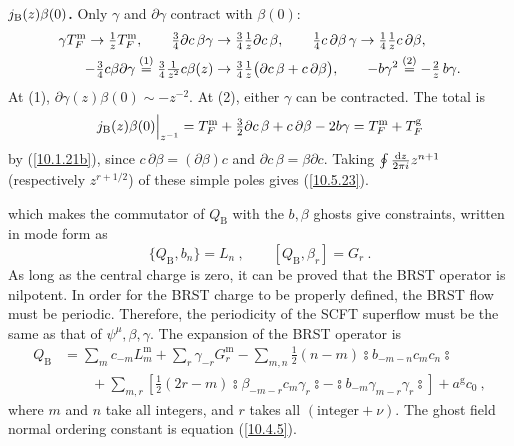 \begin{tcolorbox}[breakable]
\begin{remark}
			\textbf{$j_{\rm B}(z)\beta(0)$.} Only $\gamma$ and $\partial\gamma$ contract with $\beta(0)$:
			\begin{align*}
				\gamma T^{\mathrm m}_F\to\tfrac1zT^{\mathrm m}_F,\qquad \tfrac34\partial c\,\beta\gamma&\to\tfrac34\tfrac1z\partial c\,\beta,\qquad \tfrac14c\,\partial\beta\,\gamma\to\tfrac14\tfrac1zc\,\partial\beta,\\
				-\tfrac34c\beta\partial\gamma\overset{(1)}{=}\tfrac34\tfrac1{z^{2}}c\beta(z)&\to\tfrac34\tfrac1z\bigl(\partial c\,\beta+c\,\partial\beta\bigr),\qquad -b\gamma^{2}\overset{(2)}{=}-\tfrac2z\,b\gamma .
			\end{align*}
			At (1), $\partial\gamma(z)\beta(0)\sim-z^{-2}$. At (2), either $\gamma$ can be contracted. The total is
			\begin{equation*}
				j_{\rm B}(z)\beta(0)\Big|_{z^{-1}}=T^{\mathrm m}_F+\tfrac32\partial c\,\beta+c\,\partial\beta-2b\gamma=T^{\mathrm m}_F+T^{\mathrm g}_F
			\end{equation*}
			by (\ref{10.1.21b}), since $c\,\partial\beta=(\partial\beta)c$ and $\partial c\,\beta=\beta\partial c$. Taking $\oint\frac{\mathrm{d} z}{2\pi i}z^{n+1}$ (respectively $z^{r+1/2}$) of these simple poles gives (\ref{10.5.23}).
		\end{remark}
	\end{tcolorbox}
	which makes the commutator of $Q_{\text{B}}$ with the $b, \beta$ ghosts give constraints, written in mode form as
	\begin{equation}
		\{Q_{\text{B}},b_{n}\} = L_{n}\:, \qquad [Q_{\text{B}},\beta_{r}]=G_{r}\:. \label{10.5.23}
	\end{equation}
	As long as the central charge is zero, it can be proved that the BRST operator is nilpotent. In order for the BRST charge to be properly defined, the BRST flow must be periodic. Therefore, the periodicity of the SCFT superflow must be the same as that of $\psi^{\mu}, \beta, \gamma$. The expansion of the BRST operator is
	\begin{align}
		Q_{\text{B}} &= \sum_{m} c_{-m}L_{m}^{\text{m}} + \sum_{r}\gamma_{-r}G_{r}^{\text{m}} 
		-\sum_{m,n}\frac{1}{2}(n-m) \typecolon \!b_{-m-n} c_{m}c_{n}\typecolon  \nonumber \\
		&\qquad + \sum_{m,r}\left[\frac{1}{2}(2r-m)\typecolon \!\beta_{-m-r}c_{m}\gamma_{r}\!\typecolon
		- \typecolon\! b_{-m}\gamma_{m-r}\gamma_{r}\typecolon \right] + a^{\text{g}} c_{0} \:, \label{10.5.24}
	\end{align}
	where $m$ and $n$ take all integers, and $r$ takes all $(\text{integer}+\nu)$. The ghost field normal ordering constant is equation (\ref{10.4.5}).
